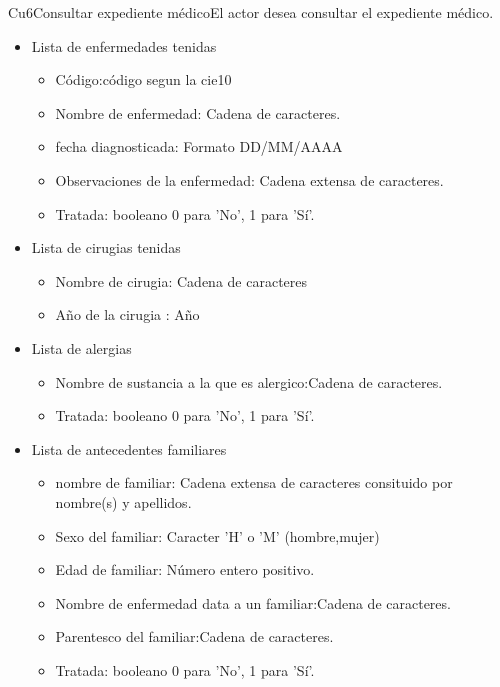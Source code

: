 \begin{UseCase}{Cu6}{Consultar expediente médico}{El actor desea consultar el expediente médico.}
{\begin{itemize}
\begin{itemize}
		\end{itemize}
        
       \item Lista de enfermedades tenidas
        \begin{itemize}
            \item Código:código segun la cie10
            \item Nombre de enfermedad: Cadena de caracteres. 
            \item fecha diagnosticada: Formato DD/MM/AAAA
            \item Observaciones de la enfermedad: Cadena extensa de caracteres.
            \item Tratada: booleano 0 para 'No', 1 para 'Sí'.

        \end{itemize}
        
        \item Lista de cirugias tenidas
        \begin{itemize}
            \item Nombre de cirugia: Cadena de caracteres
            \item Año de la cirugia : Año 
        \end{itemize}
        
        \item Lista de alergias
        \begin{itemize}
            \item Nombre de sustancia a la que es alergico:Cadena de caracteres.
            \item Tratada: booleano 0 para 'No', 1 para 'Sí'.
        \end{itemize}
        
  \item Lista de antecedentes familiares
        
        \begin{itemize}
            \item nombre de familiar: Cadena extensa de caracteres consituido por nombre(s) y apellidos.
            \item Sexo del familiar: Caracter 'H' o 'M' (hombre,mujer)
            \item Edad de familiar: Número entero positivo.
            \item Nombre de enfermedad data a un familiar:Cadena de caracteres.
            \item Parentesco del familiar:Cadena de caracteres.
            \item Tratada: booleano 0 para 'No', 1 para 'Sí'.


\end{itemize}
\end{itemize}}
\end{UseCase}
